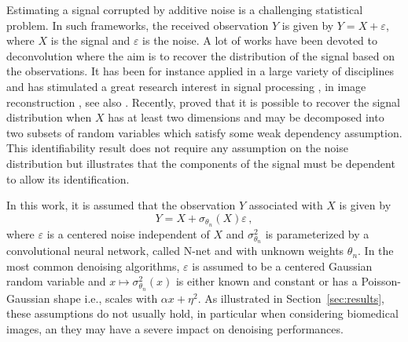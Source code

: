 \documentclass{article}
\begin{document}
Estimating a signal corrupted by additive noise  is a challenging statistical problem. In such frameworks, the received observation $Y$ is given by $Y = X + \varepsilon$,  where $X$ is the signal and $\varepsilon$ is the noise. A lot of works have been devoted to deconvolution where the aim is to recover the distribution of the signal based on the observations. It has been for instance applied in a large variety of disciplines and has stimulated a great research interest in signal processing \cite{moulines1997maximum,attias1998blind}, in image reconstruction \cite{kundur1996blind,campisi2017blind}, see also  \cite{meister:2009}. Recently, \cite{gassiat:lecorff:lehericy:2021} proved that it is possible to recover the signal distribution when $X$ has at least two dimensions and may be decomposed into two subsets of random variables which satisfy some weak dependency assumption. This identifiability result does not require any assumption on the noise distribution but illustrates that the components of the signal must be dependent to allow its identification. %

In this work, it is assumed that the observation $Y$ associated with $X$  is given by
\begin{equation}
\label{eq:def:Y}
Y = X + \sigma_{\theta_n}(X)\varepsilon\,,
\end{equation}
where $\varepsilon$ is a centered noise independent of $X$ and $\sigma^2_{\theta_n}$ is parameterized by a convolutional neural network, called N-net and with unknown weights $\theta_n$.
In the most common denoising algorithms,  $\varepsilon$ is assumed to be a centered Gaussian random variable and  $x\mapsto \sigma^2_{\theta_n}(x)$ is either known and constant or has a Poisson-Gaussian shape i.e., scales with $\alpha x + \eta^2$. As illustrated in Section~\ref{sec:results}, these assumptions do not usually hold, in particular when considering biomedical images, an they may have a severe impact on denoising performances.
\end{document}
